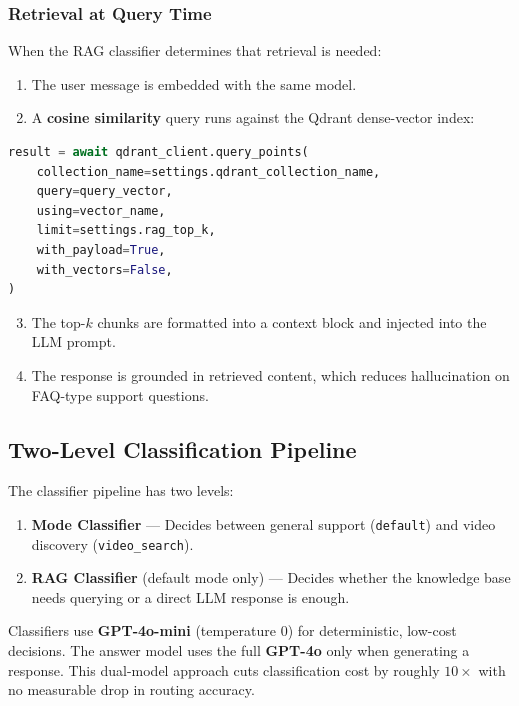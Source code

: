 \subsubsection{Retrieval at Query Time}

When the RAG classifier determines that retrieval is needed:

\begin{enumerate}
  \item The user message is embedded with the same model.
  \item A \textbf{cosine similarity} query runs against the Qdrant dense-vector index:
\end{enumerate}

\begin{lstlisting}[language=python, caption={Qdrant cosine similarity retrieval}]
result = await qdrant_client.query_points(
    collection_name=settings.qdrant_collection_name,
    query=query_vector,
    using=vector_name,
    limit=settings.rag_top_k,
    with_payload=True,
    with_vectors=False,
)
\end{lstlisting}

\begin{enumerate}
  \setcounter{enumi}{2}
  \item The top-$k$ chunks are formatted into a context block and injected into the LLM prompt.
  \item The response is grounded in retrieved content, which reduces hallucination on FAQ-type
    support questions.
\end{enumerate}

\subsection{Two-Level Classification Pipeline}

The classifier pipeline has two levels:

\begin{enumerate}
  \item \textbf{Mode Classifier} — Decides between general support (\texttt{default}) and
    video discovery (\texttt{video\_search}).
  \item \textbf{RAG Classifier} (default mode only) — Decides whether the knowledge base needs
    querying or a direct LLM response is enough.
\end{enumerate}

Classifiers use \textbf{GPT-4o-mini} (temperature 0) for deterministic, low-cost decisions.
The answer model uses the full \textbf{GPT-4o} only when generating a response. This
dual-model approach cuts classification cost by roughly $10\times$ with no measurable drop in
routing accuracy.

